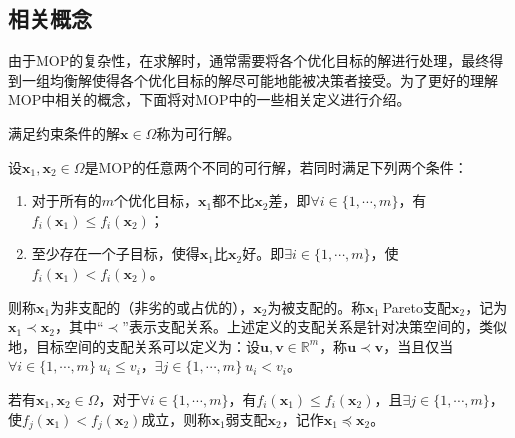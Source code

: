 \subsection{相关概念}
\label{subsec:背景介绍:多目标优化问题:相关概念}
由于MOP的复杂性，在求解时，通常需要将各个优化目标的解进行处理，最终得到一组均衡解使得各个优化目标的解尽可能地能被决策者接受。为了更好的理解MOP中相关的概念，下面将对MOP中的一些相关定义进行介绍。
\begin{definition}[可行解]
    \label{def:可行解}
    满足约束条件的解$\mathbf{x} \in \Omega$称为可行解。
\end{definition}
\par
\begin{definition}[Pareto支配]
    \label{def:Pareto支配}
    设$\mathbf{x}_1, \mathbf{x}_2 \in \Omega$是MOP的任意两个不同的可行解，若同时满足下列两个条件：
    \begin{enumerate}
        \item 对于所有的$m$个优化目标，$\mathbf{x}_1$都不比$\mathbf{x}_2$差，即$\forall i \in \{ 1, \cdots, m \}$，有$f_i(\mathbf{x}_1) \leq f_i(\mathbf{x}_2)$；
        \item 至少存在一个子目标，使得$\mathbf{x}_1$比$\mathbf{x}_2$好。即$\exists i \in \{ 1, \cdots, m \}$，使$f_i(\mathbf{x}_1) < f_i(\mathbf{x}_2)$。
    \end{enumerate}
    则称$\mathbf{x}_1$为非支配的（非劣的或占优的），$\mathbf{x}_2$为被支配的。称$\mathbf{x}_1 \ $Pareto支配$\mathbf{x}_2$，记为$\mathbf{x}_1 \prec \mathbf{x}_2$，其中“$\prec$”表示支配关系。上述定义的支配关系是针对决策空间的，类似地，目标空间的支配关系可以定义为：设$\mathbf{u}, \mathbf{v} \in \mathbb{R}^m$，称$\mathbf{u} \prec \mathbf{v}$，当且仅当$\forall i \in \{ 1, \cdots, m \} \ u_i \leq v_i$，$\exists j \in  \{ 1, \cdots, m \} \ u_i < v_i$。
\end{definition}
\par
\begin{definition}[弱支配]
    \label{def:弱支配}
    若有$\mathbf{x}_1,\mathbf{x}_2 \in \Omega$，对于$\forall i \in \{ 1, \cdots, m \}$，有$f_i(\mathbf{x}_1) \leq f_i(\mathbf{x}_2)$，且$\exists j \in \{ 1, \cdots, m\}$，使$f_j(\mathbf{x}_1) < f_j(\mathbf{x}_2)$成立，则称$\mathbf{x}_1$弱支配$\mathbf{x}_2$，记作$\mathbf{x}_1 \preceq \mathbf{x}_2$。
\end{definition}
